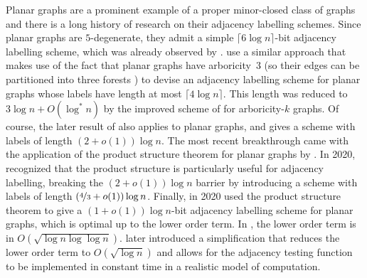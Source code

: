 \documentclass{patmorin}
\newcommand{\Oh}{O}
\begin{document}
Planar graphs are a prominent example of a proper minor-closed class of graphs and there is a long history of research
on their adjacency labelling schemes.
Since planar graphs are $5$-degenerate,
they admit a simple $\lceil6\log n\rceil$-bit adjacency labelling scheme, which was already observed by \citet{muller:local}.
\citet{kannan.naor.ea:implicit} use a similar approach that makes use of the fact that planar graphs have arboricity~3 (so their edges can be partitioned into three forests \citep{nash-williams:edge-disjoint}) to devise an adjacency labelling scheme for planar graphs whose labels have length at most $\lceil4\log n\rceil$. This length was reduced to $3\log{n} + \Oh(\log^*{n})$ by the improved scheme of \citet{AR02} for arboricity-$k$ graphs. 
Of course, the later result of \citet{gavoille.labourel:shorter} also applies to planar graphs, and gives a scheme with labels of length $(2+o(1))\log n$.
The most recent breakthrough came with the application of the product structure theorem for planar graphs by \citet{dujmovic.joret.ea:planar}.
In 2020, \citet{BGP22} recognized that the product structure is particularly useful for adjacency labelling, breaking the $(2+o(1))\log n$  barrier by introducing a scheme with labels of length $(\nicefrac{4}{3}+o(1))\log n$.
Finally, in 2020 \citet{dujmovic.esperet.ea:adjacency} used the product structure theorem to give a $(1+o(1))\log n$-bit adjacency labelling scheme for planar graphs, which is optimal up to the lower order term. In \citet{dujmovic.esperet.ea:adjacency}, the lower order term is in $\Oh(\sqrt{\log n\log\log n})$.  \citet{gawrychowski.janczewski:simpler} later introduced a simplification that reduces the lower order term to  $\Oh(\sqrt{\log n})$ and allows for the adjacency testing function to be implemented in constant time in a realistic model of computation.
\end{document}
